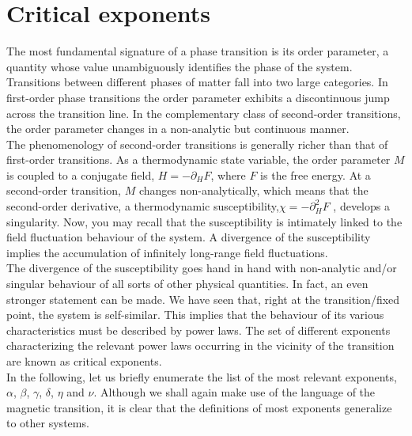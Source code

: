 \documentclass[cyan]{elegantnote}
\begin{document}
\section{Critical exponents}
The most fundamental signature of a phase transition is its order parameter, a quantity whose value unambiguously identifies the phase of the system. Transitions between different phases of matter fall into two large categories. 
In first-order phase transitions the order parameter exhibits a discontinuous jump across the transition line.
In the complementary class of second-order transitions, the order parameter changes in a non-analytic but continuous manner.
\\ 
The phenomenology of second-order transitions is generally richer than that of first-order transitions. 
As a thermodynamic state variable, the order parameter $M$ is coupled to a conjugate field, $H = -\partial_H F$, where $F$ is the free energy. 
At a second-order transition, $M$ changes non-analytically, which means that the second-order derivative, a thermodynamic susceptibility,$\chi = -\partial_H^2 F$ , develops a singularity. 
Now, you may recall that the susceptibility is intimately linked to the field fluctuation behaviour of the system. A divergence of the susceptibility implies the accumulation of infinitely long-range field fluctuations.
\\
The divergence of the susceptibility goes hand in hand with non-analytic and/or singular behaviour of all sorts of other physical quantities. In fact, an even stronger statement can be made.
We have seen that, right at the transition/fixed point, the system is self-similar. This implies that the behaviour of its various characteristics must be described by power laws.
The set of different exponents characterizing the relevant power laws occurring in the vicinity of the transition are known as critical exponents.
\\
In the following, let us briefly enumerate the list of the most relevant exponents, $\alpha$, $\beta$, $\gamma$, $\delta$, $\eta$ and $\nu$. 
Although we shall again make use of the language of the magnetic transition, it is clear that the definitions of most exponents generalize to other systems.
\end{document}
